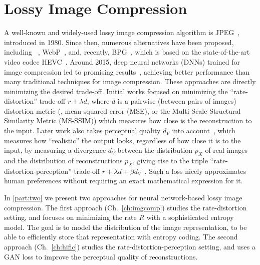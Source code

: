 \section{Lossy Image Compression}

A well-known and widely-used lossy image compression algorithm is
JPEG~\cite{jpeg1992wallace}, introduced in 1980. Since then, numerous
alternatives have been proposed, including \jpegk~\cite{jpeg2000taubman},
WebP~\cite{webpurl}, and, recently, BPG~\cite{bpg}, which is based on the
state-of-the-art video codec HEVC~\cite{sullivan2012overview}. Around 2015,
deep neural networks (DNNs) trained for image compression led to promising
results~\cite{toderici2015variable, toderici2016full, theis2017lossy,
balle2016end, agustsson2017soft, li2017learning}, achieving better performance
than many traditional techniques for image compression. These approaches are
directly minimizing the desired trade-off. Initial works focused on
minimizing the ``rate-distortion'' trade-off $r+\lambda d$, where $d$ is a
pairwise (between pairs of images) distortion metric (\eg, mean-squared error
(MSE), or the Multi-Scale Structural Similarity Metric (MS-SSIM)) which
measures how close is the reconstruction to the input. Later work also takes
perceptual quality $d_V$ into
account~\cite{agustsson2019extreme,blau2019rethinking}, which measures how
``realistic'' the output looks, regardless of how close it is to the input, by
measuring a divergence $d_V$ between the distribution $p_X$ of real images and
the distribution of reconstructions $p_{\hat X}$, giving rise to the triple
``rate-distortion-perception'' trade-off $r+\lambda d+\beta
d_V$~\cite{blau2019rethinking}. Such a loss nicely approximates
human preferences without requiring an exact mathematical expression for it.

In \ref{part:two} we present two approaches for neural network-based lossy
image compression. The first approach (Ch.~\ref{ch:imgcomp}) studies the
rate-distortion setting, and focuses on minimizing the rate $R$ with a
sophisticated entropy model. The goal is to model the distribution of the image
representation, to be able to efficiently store that representation with
entropy coding. The second approach (Ch.~\ref{ch:hific}) studies the
rate-distortion-perception setting, and uses a GAN loss to improve the perceptual
quality of reconstructions.


